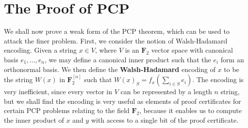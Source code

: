\section{The Proof of PCP}

We shall now prove a weak form of the PCP theorem, which can be used to attack the finer problem. First, we consider the notion of Walsh-Hadamard encoding. Given a string $x \in V$, where $V$ is an $\mathbf{F}_2$ vector space with canonical basis $e_1, \dots, e_n$, we may define a canonical inner product such that the $e_i$ form an orthonormal basis. We then define the {\bf Walsh-Hadamard} encoding of $x$ to be the string $W(x)$ in $\mathbf{F}_2^{[n]}$ such that $W(x)_S = f_x(\sum_{i \in S} e_i)$. The encoding is very inefficient, since every vector in $V$ can be represented by a length $n$ string, but we shall find the encoding is very useful as elements of proof certificates for certain PCP problems relating to the field $\mathbf{F}_2$, because it enables us to compute the inner product of $x$ and $y$ with access to a single bit of the proof certificate.

